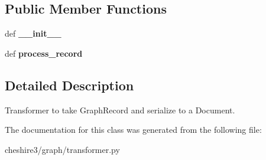 \subsection*{Public Member Functions}
\begin{DoxyCompactItemize}
\item 
\hypertarget{classcheshire3_1_1graph_1_1transformer_1_1_rdf_xml_transformer_ab800ebafc063c90a199e40de55f1503d}{def {\bfseries \-\_\-\-\_\-init\-\_\-\-\_\-}}\label{classcheshire3_1_1graph_1_1transformer_1_1_rdf_xml_transformer_ab800ebafc063c90a199e40de55f1503d}

\item 
\hypertarget{classcheshire3_1_1graph_1_1transformer_1_1_rdf_xml_transformer_aca88c20c88e046131bc9d6ebbcee36b9}{def {\bfseries process\-\_\-record}}\label{classcheshire3_1_1graph_1_1transformer_1_1_rdf_xml_transformer_aca88c20c88e046131bc9d6ebbcee36b9}

\end{DoxyCompactItemize}


\subsection{Detailed Description}
\begin{DoxyVerb}Transformer to take GraphRecord and serialize to a Document.\end{DoxyVerb}
 

The documentation for this class was generated from the following file\-:\begin{DoxyCompactItemize}
\item 
cheshire3/graph/transformer.\-py\end{DoxyCompactItemize}
